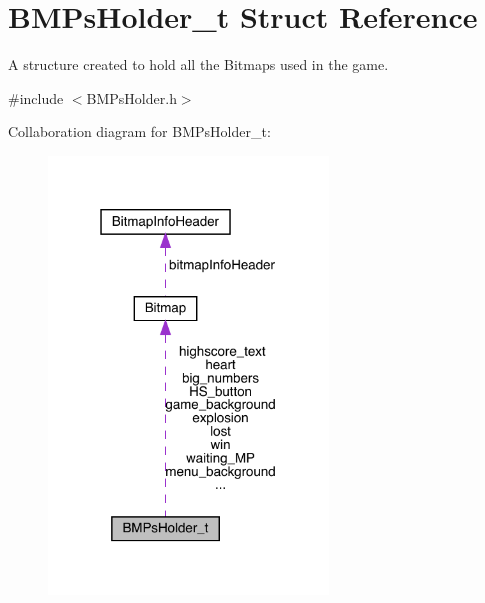 \hypertarget{struct_b_m_ps_holder__t}{}\section{B\+M\+Ps\+Holder\+\_\+t Struct Reference}
\label{struct_b_m_ps_holder__t}


A structure created to hold all the Bitmaps used in the game.  




{\ttfamily \#include $<$B\+M\+Ps\+Holder.\+h$>$}



Collaboration diagram for B\+M\+Ps\+Holder\+\_\+t\+:
\nopagebreak
\begin{figure}[H]
\begin{center}
\leavevmode
\includegraphics[width=211pt]{struct_b_m_ps_holder__t__coll__graph}
\end{center}
\end{figure}
